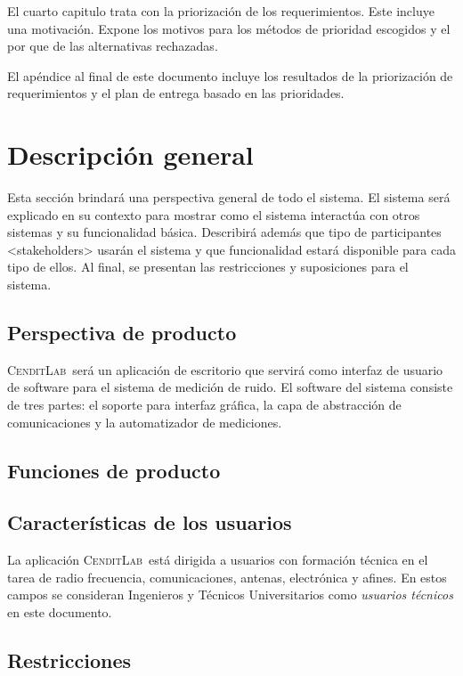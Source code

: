 \documentclass[paper=letter,oneside,fontsize=12pt, parskip=full]{scrartcl}
\newcommand{\AppName}{\textsc{CenditLab}\ }
\newcommand{\smr}{sistema de medición de ruido}
\begin{document}
	El cuarto capitulo trata con la priorización de los requerimientos. Este incluye una motivación. Expone los motivos para los métodos de prioridad escogidos y el por que de las alternativas rechazadas.  
	
	El apéndice al final de este documento incluye los resultados de la priorización de requerimientos y el plan de entrega basado en las prioridades.
	
	\section{Descripción general}
	
	Esta sección brindará una perspectiva general de todo el sistema. El sistema será explicado en su contexto para mostrar como el sistema interactúa con otros sistemas y su funcionalidad básica. Describirá además que tipo de participantes <stakeholders> usarán el sistema y que funcionalidad estará disponible para cada tipo de ellos. Al final, se presentan las restricciones y suposiciones para el sistema.
	
	\subsection{Perspectiva de producto}
	
	\AppName será un aplicación de escritorio que servirá como interfaz de usuario de software para el \smr. El software del sistema consiste de tres partes: el soporte para interfaz gráfica, la capa de abstracción de comunicaciones y la automatizador de mediciones.	
	
	\subsection{Funciones de producto}
	
	\subsection{Características de los usuarios}
	
	La aplicación \AppName está dirigida a usuarios con formación técnica en el tarea de radio frecuencia, comunicaciones, antenas, electrónica y afines. En estos campos se  consideran Ingenieros y Técnicos Universitarios como \emph{usuarios técnicos} en este documento.
	
	\subsection{Restricciones}
	
\end{document}
